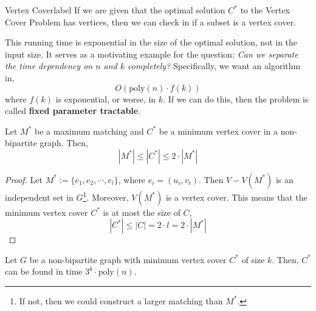 \begin{ex}{Vertex Cover}{label}
	If we are given that the optimal solution $C^*$ to the Vertex Cover Problem has  vertices, then we can check in  if a subset  is a vertex cover.

	This running time is exponential in the size of the optimal solution, not in the input size. It serves as a motivating example for the question: \textit{Can we separate the time dependency on $n$ and $k$ completely?} Specifically, we want an algorithm in,
	\[O(\text{poly}(n) \cdot f(k))\]
	\noindent where $f(k)$ is exponential, or worse, in $k$. If we can do this, then the problem is called \textbf{fixed parameter tractable}.
\end{ex}

\begin{lem}
	Let $M^*$ be a maximum matching and $C^*$ be a minimum vertex cover in a non-bipartite graph. Then,
	\[\left|M^{*}\right| \leq\left|C^{*}\right| \leq 2 \cdot\left|M^{*}\right|\]
\end{lem}

\begin{proof}
	Let $M^* := \{e_1, e_2, \cdots, e_l\}$, where $e_i = (u_i, v_i)$. Then $V - V(M^*)$ is an independent set in $G$\footnote{If not, then we could construct a larger matching than $M^*$.}. Moreover, $V(M^*)$ is a vertex cover. This means that the minimum vertex cover $C^*$ is at most the size of $C$,
	\[\left|C^{*}\right| \leq|C|=2 \cdot l=2 \cdot\left|M^{*}\right|\]
\end{proof}

\begin{thm}
	Let $G$ be a non-bipartite graph with minimum vertex cover $C^*$ of size $k$. Then, $C^*$ can be found in time $3^k \cdot \text{poly}(n)$.
\end{thm}

